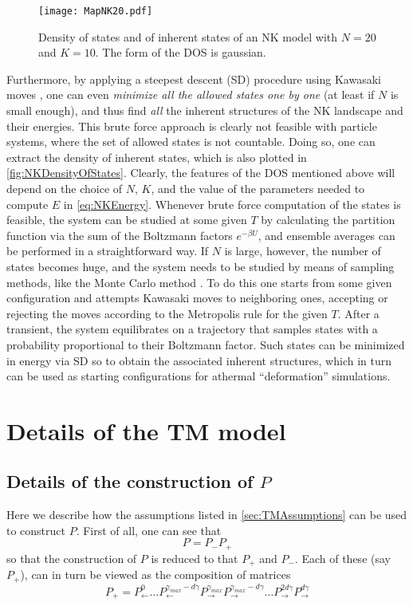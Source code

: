 \begin{figure} 
\centering 
\texttt{[image: MapNK20.pdf]} 
\caption{Density of states and of inherent states of an NK model with $N=20$ and $K=10$. The form of the DOS is gaussian. \label{fig:NKDensityOfStates}}
\end{figure}

Furthermore, by applying a steepest descent (SD) procedure using Kawasaki moves \cite{domb2000phase}, one can even \emph{minimize all the allowed states one by one} (at least if $N$ is small enough), and thus find \emph{all} the inherent structures of the NK landscape and their energies. This brute force approach is clearly not feasible with particle systems, where the set of allowed states is not countable. Doing so, one can extract the density of inherent states, which is also plotted in \autoref{fig:NKDensityOfStates}. Clearly, the features of the DOS mentioned above will depend on the choice of $N$, $K$, and the value of the parameters needed to compute $E$ in \autoref{eq:NKEnergy}.
Whenever brute force computation of the states is feasible, the system can be studied at some given $T$ by calculating the partition function via the sum of the Boltzmann factors $e^{-\beta U}$, and ensemble averages can be performed in a straightforward way. If $N$ is large, however, the number of states becomes huge, and the system needs to be studied by means of sampling methods, like the Monte Carlo method \cite{frenkel2001understanding}. To do this one starts from some given configuration and attempts Kawasaki moves to neighboring ones, accepting or rejecting the moves according to the Metropolis rule for the given $T$. After a transient, the system equilibrates on a trajectory that samples states with a probability proportional to their Boltzmann factor. Such states can be minimized in energy via SD so to obtain the associated inherent structures, which in turn can be used as starting configurations for athermal ``deformation'' simulations.

\chapter{Details of the TM model \label{app:TMDetails}}

\section*{Details of the construction of $P$}

Here we describe how the assumptions listed in \autoref{sec:TMAssumptions} can be used to construct $P$.
First of all, one can see that
\begin{equation}
    P = P_{-} P_{+} 
\end{equation}
so that the construction of $P$ is reduced to that $P_{+}$ and $P_{-}$. 
Each of these (say $P_{+}$), can in turn be viewed as the composition of matrices 
\begin{equation}
P_{+} =
P_{\leftarrow}^{0}
\ldots
P_{\leftarrow}^{\gamma_{max} - d\gamma}
P_{\rightarrow}^{\gamma_{max}}
P_{\rightarrow}^{\gamma_{max} - d\gamma}
\ldots
P_{\rightarrow}^{2d\gamma}
P_{\rightarrow}^{d\gamma}
\end{equation}

